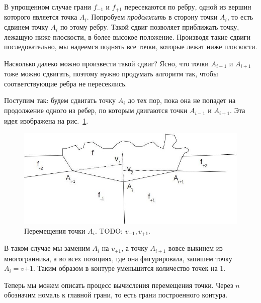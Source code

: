\documentclass[a4paper,12pt, titlepage]{article}
\begin{document}
\begin{flushleft}
  В упрощенном случае грани $f_{-1}$ и $f_{+1}$ пересекаются по ребру, одной из вершин которого является
точка $A_{i}$. Попробуем \textit{продолжить} в сторону точки $A_{i}$, то есть сдвинем точку $A_{i}$ 
по этому ребру. Такой сдвиг позволяет приближать точку, лежащую ниже плоскости, в более высокое 
положение. Производя такие сдвиги последовательно, мы надеемся поднять все точки, которые лежат ниже 
плоскости.
\end{flushleft}
\begin{flushleft}
  Насколько далеко можно произвести такой сдвиг? Ясно, что точки $A_{i - 1}$ и $A_{i + 1}$ тоже можно
сдвигать, поэтому нужно продумать алгоритм так, чтобы соответствующие ребра не пересеклись.
\end{flushleft}
\begin{flushleft}
  Поступим так: будем сдвигать точку $A_{i}$ до тех пор, пока она не попадет на продолжение одного из 
ребер, по которым двигаются точки $A_{i - 1}$ и $A_{i + 1}$. Эта идея изображена на рис.~\ref{pic-step-3}.
\end{flushleft}
\begin{flushleft}
  \begin{figure}[ht]
    \includegraphics[clip, width=13cm]{img/pic-step-3.jpg}
    \caption{Перемещения точки $A_{i}$. TODO: $v_{-1}, v_{+1}$.}\label{pic-step-3}
  \end{figure}
\end{flushleft}
\begin{flushleft}
  В таком случае мы заменим $A_{i}$ на $v_{+1}$, а точку $A_{i + 1}$ вовсе выкинем из многогранника, а во
всех позициях, где она фигурировала, запишем точку $A_{i} = v{+1}$. Таким образом в контуре уменьшится
количество точек на 1.
\end{flushleft}
\begin{flushleft}
 Теперь мы можем описать процесс вычисления перемещения точки. Через $n$ обозначим номаль к главной грани,
то есть грани построенного контура.
\end{flushleft}
\end{document}
